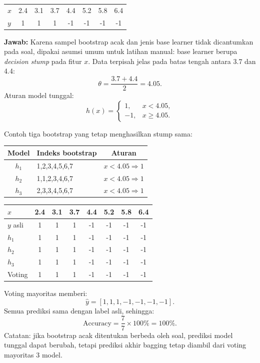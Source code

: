 \documentclass[10pt,a4paper,twocolumn]{article}
\newcommand{\jawab}{\textbf{Jawab: }}
\begin{document}
\begin{center}
\scriptsize
\begin{tabular}{@{}lccccccc@{}}
\toprule
$x$ & 2.4 & 3.1 & 3.7 & 4.4 & 5.2 & 5.8 & 6.4 \\
$y$ & 1 & 1 & 1 & -1 & -1 & -1 & -1 \\
\bottomrule
\end{tabular}
\end{center}

\jawab Karena sampel bootstrap acak dan jenis base learner tidak dicantumkan pada soal, dipakai asumsi umum untuk latihan manual: base learner berupa \textit{decision stump} pada fitur $x$. Data terpisah jelas pada batas tengah antara 3.7 dan 4.4:
\[
\theta=\frac{3.7+4.4}{2}=4.05.
\]
Aturan model tunggal:
\[
h(x)=\begin{cases}
1, & x<4.05,\\
-1, & x\ge 4.05.
\end{cases}
\]

Contoh tiga bootstrap yang tetap menghasilkan stump sama:
\begin{center}
\scriptsize
\begin{tabular}{@{}clc@{}}
\toprule
Model & Indeks bootstrap & Aturan \\
\midrule
$h_1$ & 1,2,3,4,5,6,7 & $x<4.05\Rightarrow 1$ \\
$h_2$ & 1,1,2,3,4,6,7 & $x<4.05\Rightarrow 1$ \\
$h_3$ & 2,3,3,4,5,6,7 & $x<4.05\Rightarrow 1$ \\
\bottomrule
\end{tabular}
\end{center}

\begin{center}
\scriptsize
\begin{tabular}{@{}lccccccc@{}}
\toprule
$x$ & 2.4 & 3.1 & 3.7 & 4.4 & 5.2 & 5.8 & 6.4 \\
\midrule
$y$ asli & 1 & 1 & 1 & -1 & -1 & -1 & -1 \\
$h_1$ & 1 & 1 & 1 & -1 & -1 & -1 & -1 \\
$h_2$ & 1 & 1 & 1 & -1 & -1 & -1 & -1 \\
$h_3$ & 1 & 1 & 1 & -1 & -1 & -1 & -1 \\
Voting & 1 & 1 & 1 & -1 & -1 & -1 & -1 \\
\bottomrule
\end{tabular}
\end{center}

Voting mayoritas memberi:
\[
\hat{y}=[1,1,1,-1,-1,-1,-1].
\]
Semua prediksi sama dengan label asli, sehingga:
\[
\text{Accuracy}=\frac{7}{7}\times 100\%=100\%.
\]
Catatan: jika bootstrap acak ditentukan berbeda oleh soal, prediksi model tunggal dapat berubah, tetapi prediksi akhir bagging tetap diambil dari voting mayoritas 3 model.
\end{document}
